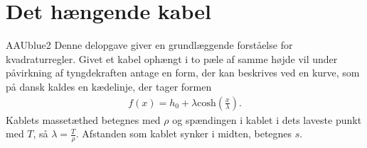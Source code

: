 \chapter{Det hængende kabel}
\begin{color}{AAUblue2}
%
Denne delopgave giver en grundlæggende forståelse for kvadraturregler.
Givet et kabel ophængt i to pæle af samme højde vil under påvirkning af tyngdekraften antage en form, der kan beskrives ved en kurve, som på dansk kaldes en kædelinje, der tager formen 
\begin{align*}
f(x)=h_0 + \lambda \text{cosh} \left( \frac{x}{\lambda} \right).
\end{align*}
Kablets massetæthed betegnes med $\rho$ og spændingen i kablet i dets laveste punkt med $T$, så $\lambda = \frac{T}{\rho}$. Afstanden som kablet synker i midten, betegnes $s$.
% 
\end{color}



